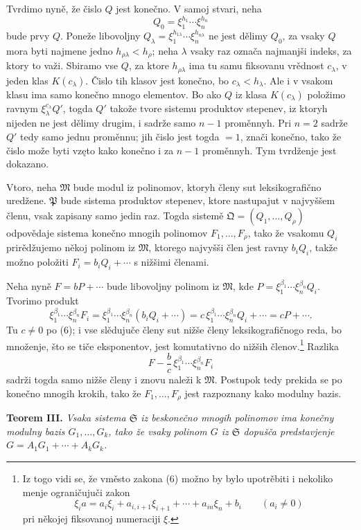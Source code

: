 \documentclass[11pt]{article}
\providecommand{\mM}{\mathfrak M}
\providecommand{\mS}{\mathfrak S}
\providecommand{\mP}{\mathfrak P}
\providecommand{\mQ}{\mathfrak Q}
\begin{document}
Tvrdimo nyně, že čislo \(Q\) jest konečno. V samoj stvari, neha
\[
 Q_0=\xi_1^{h_1}\cdots\xi_n^{h_n}
\]
bude prvy \(Q\). Poneže libovoljny \(Q_\lambda=\xi_1^{h_{1\lambda}}\cdots\xi_n^{h_{n\lambda}}\) ne jest dělimy \(Q_0\), za vsaky \(Q\) mora byti najmene jedno \(h_{\rho\lambda}<h_\rho\); neha \(\lambda\) vsaky raz označa najmanjši indeks, za ktory to važi. Sbiramo vse \(Q\), za ktore \(h_{\rho\lambda}\) ima tu samu fiksovanu vrědnost \(c_\lambda\), v jeden klas \(K(c_\lambda)\). Čislo tih klasov jest konečno, bo \(c_\lambda<h_\lambda\). Ale i v vsakom klasu ima samo konečno mnogo elementov. Bo ako \(Q\) iz klasa \(K(c_\lambda)\) položimo ravnym \(\xi_\lambda^{c_\lambda}Q'\), togda \(Q'\) takože tvore sistemu produktov stepenev, iz ktoryh nijeden ne jest dělimy drugim, i sadrže samo \(n-1\) proměnnyh. Pri \(n=2\) sadrže \(Q'\) tedy samo jednu proměnnu; jih čislo jest togda \(=1\), znači konečno, tako že čislo može byti vzęto kako konečno i za \(n-1\) proměnnyh. Tym tvrdženje jest dokazano.

Vtoro, neha \(\mM\) bude modul iz polinomov, ktoryh členy sut leksikografično uredžene. \(\mP\) bude sistema produktov stepenev, ktore nastupajut v najvyššem členu, vsak zapisany samo jedin raz. Togda sistemě \(\mQ=(Q_1,\ldots,Q_\rho)\) odpovědaje sistema konečno mnogih polinomov \(F_1,\ldots,F_\rho\), tako že vsakomu \(Q_i\) prirědžujemo někoj polinom iz \(\mM\), ktorego najvyšši člen jest ravny \(b_iQ_i\), takže možno položiti \(F_i=b_iQ_i+\cdots\) s nižšimi členami.

Neha nyně \(F=bP+\cdots\) bude libovoljny polinom iz \(\mM\), kde \(P=\xi_1^{\beta_1}\cdots\xi_n^{\beta_n}Q_i\). Tvorimo produkt
\[
 \xi_1^{\beta_1}\cdots\xi_n^{\beta_n}F_i
 =\xi_1^{\beta_1}\cdots\xi_n^{\beta_n}(b_iQ_i+\cdots)
 =c\,\xi_1^{\beta_1}\cdots\xi_n^{\beta_n}Q_i+\cdots
 =cP+\cdots.
\]
Tu \(c\ne0\) po (6); i vse slědujuče členy sut nižše členy leksikografičnogo reda, bo množenje, što se tiče eksponentov, jest komutativno do nižših členov.\footnote{Iz togo vidi se, že vměsto zakona (6) možno by bylo upotrěbiti i nekoliko menje ograničujuči zakon
\[
 \xi_i a=a_i\xi_i+a_{i,i+1}\xi_{i+1}+\cdots+a_{in}\xi_n+b_i\qquad(a_i\ne0)
\]
pri někojej fiksovanoj numeraciji \(\xi\).} Razlika
\[
 F-\frac bc\,\xi_1^{\beta_1}\cdots\xi_n^{\beta_n}F_i
\]
sadrži togda samo nižše členy i znovu naleži k \(\mM\). Postupok tedy prekida se po konečno mnogih krokih, tako že \(F_1,\ldots,F_\rho\) jest razpoznany kako modulny bazis.

\textbf{Teorem III.} \textit{Vsaka sistema \(\mS\) iz beskonečno mnogih polinomov ima konečny modulny bazis \(G_1,\ldots,G_k\), tako že vsaky polinom \(G\) iz \(\mS\) dopušča predstavjenje \(G=A_1G_1+\cdots+A_kG_k\).}
\end{document}
